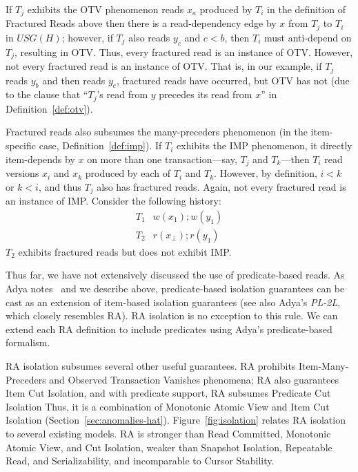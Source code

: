 If $T_j$ exhibits the OTV phenomenon reads $x_a$ produced by $T_i$ in
the definition of Fractured Reads above then there is a
read-dependency edge by $x$ from $T_j$ to $T_i$ in $USG(H)$; however,
if $T_j$ also reads $y_c$ and $c < b$, then $T_i$ must anti-depend on
$T_j$, resulting in OTV. Thus, every fractured read is an instance of
OTV. However, not every fractured read is an instance of OTV. That is,
in our example, if $T_j$ reads $y_b$ and then reads $y_c$, fractured
reads have occurred, but OTV has not (due to the clause that ``$T_j$'s
read from $y$ precedes its read from $x$'' in
Definition~\ref{def:otv}).

Fractured reads also subsumes the many-preceders phenomenon (in the
item-specific case, Definition~\ref{def:imp}). If $T_i$ exhibits the
IMP phenomenon, it directly item-depends by $x$ on more than one
transaction---say, $T_j$ and $T_k$---then $T_i$ read versions $x_i$
and $x_k$ produced by each of $T_i$ and $T_k$. However, by definition,
$i < k$ or $k < i$, and thus $T_j$ also has fractured reads. Again,
not every fractured read is an instance of IMP. Consider the following
history:
\begin{eqnarray}
T_1 & w(x_1); w(y_1)\\
T_2 & r(x_\bot); r(y_1)\nonumber
\end{eqnarray}
$T_2$ exhibits fractured reads but does not exhibit IMP.

 Thus far, we have not extensively discussed the
use of predicate-based reads. As Adya notes~\cite{adya} and
we describe above, predicate-based isolation guarantees can be cast as
an extension of item-based isolation guarantees (see also Adya's
\textit{PL-2L}, which closely resembles RA). RA isolation is no
exception to this rule. We can extend each RA definition to include
predicates using Adya's predicate-based formalism.

 RA isolation subsumes
several other useful guarantees. RA prohibits Item-Many-Preceders and Observed
Transaction Vanishes phenomena; RA also guarantees Item Cut
Isolation, and with predicate support, RA subsumes
Predicate Cut Isolation Thus, it is a combination of
Monotonic Atomic View and Item Cut Isolation (Section~\ref{sec:anomalies-hat}).
 Figure~\ref{fig:isolation} relates RA isolation to
several existing models. RA is stronger than Read Committed, Monotonic
Atomic View, and Cut Isolation, weaker than Snapshot
Isolation, Repeatable Read, and Serializability, and incomparable to
Cursor Stability.


